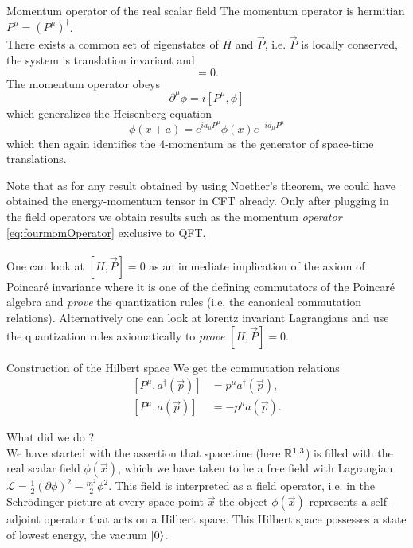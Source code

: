 \begin{mybox}{Momentum operator of the real scalar field}
The momentum operator is hermitian $P^\mu=(P^\mu)^\dagger$.\\There exists a common set of eigenstates of $H$ and $\vec{P}$, i.e. $\vec{P}$ is locally conserved, the system is translation invariant and
\begin{equation}
	[H,\vec{P}]=0.
\end{equation}
The momentum operator obeys
\begin{equation}
	\partial^\mu \phi = i[P^\mu,\phi]
\end{equation}
which generalizes the Heisenberg equation
\begin{equation}
	\phi(x+a) = e^{i a_\mu P^\mu} \phi(x) e^{-ia_\mu P^\mu}
\end{equation}
which then again identifies the $4$-momentum as the generator of space-time translations.
\end{mybox}
Note that as for any result obtained by using Noether's theorem, we could have obtained the energy-momentum tensor in CFT already. Only after plugging in the field operators we obtain results such as the momentum \emph{operator} \ref{eq:fourmomOperator} exclusive to QFT.\\
\\
One can look at $[H,\vec{P}]=0$ as an immediate implication of the axiom of Poincaré invariance where it is one of the defining commutators of the Poincaré algebra and \emph{prove} the quantization rules (i.e. the canonical commutation relations). Alternatively one can look at lorentz invariant Lagrangians and use the quantization rules axiomatically to \emph{prove} $[H,\vec{P}]=0$.
\begin{mybox}{Construction of the Hilbert space}
	We get the commutation relations
	\begin{align}
		\left[P^{\mu}, a^{\dagger} (\vec{p})\right] & = p^{\mu} a^{\dagger}(\vec{p}), \\
		\left[P^{\mu},a(\vec{p})\right] &= -p^{\mu} a(\vec{p}).
	\end{align}
\end{mybox}
What did we do ?\\
We have started with the assertion that spacetime (here $\mathbb{R}^{1,3}$) is filled with the real scalar field $\phi(\vec{x})$, which we have taken to be a free field with Lagrangian $\mathcal{L}=\frac{1}{2} (\partial \phi)^2 - \frac{m^2}{2} \phi^2$. This field is interpreted as a field operator, i.e. in the Schrödinger picture at every space point $\vec{x}$ the object $\phi(\vec{x})$ represents a self-adjoint operator that acts on a Hilbert space. This Hilbert space possesses a state of lowest energy, the vacuum $\ket{0}$.


